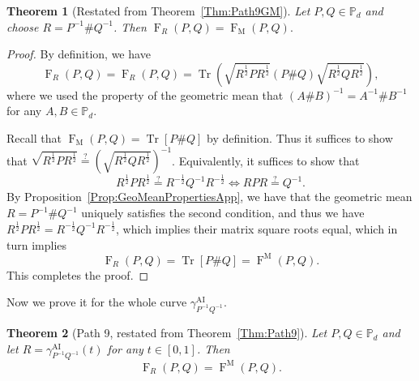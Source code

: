 \documentclass[12pt]{article}
\newtheorem{theorem}{Theorem}[section] %
\theoremstyle{definition}
\begin{document}
\begin{theorembox}
\begin{theorem} [Restated from Theorem~\ref{Thm:Path9GM}] \label{AppThm:Path9GM}
Let $P,Q \in \mathbb{P}_d$ and choose $R = P^{-1} \# Q^{-1}$. Then $\operatorname{F}_R(P,Q) = \operatorname{F}_\mathrm{M}(P,Q).$
\end{theorem}
\label{AppThm:MatsFidelityatGeoMean}
\end{theorembox}

\begin{proof}
By definition, we have
\begin{equation}
\operatorname{F}_R(P,Q) = \operatorname{F}_R(P,Q) = \operatorname{Tr}\left(\sqrt{R^{\frac 12} P R^{\frac 12}} (P \# Q) \sqrt{R^{\frac 12} Q R^{\frac 12}}\right), 
\label{Eq:58}
\end{equation}
where we used the property of the geometric mean that $(A \# B)^{-1} = A^{-1} \# B^{-1}$ for any $A,B \in \mathbb{P}_d$. 

Recall that $\operatorname{F}_\mathrm{M}(P,Q) = \operatorname{Tr}[P \# Q]$ by definition. Thus it suffices to show that $\sqrt{R^{\frac 12} P R^{\frac 12}} \stackrel{?}{=} \left(\sqrt{R^{\frac 12} Q R^{\frac 12}}\right)^{-1}$. Equivalently, it suffices to show that
\begin{equation}
R^{\frac 12} P R^{\frac 12} \stackrel{?}{=} R^{-\frac 12} Q^{-1} R^{-\frac 12} \Longleftrightarrow R P R \stackrel{?}{=} Q^{-1}.
\end{equation} 
By Proposition~\ref{Prop:GeoMeanPropertiesApp}, we have that the geometric mean $R = P^{-1} \# Q^{-1}$ uniquely satisfies the second condition, and thus we have $R^{\frac 12} P R^{\frac 12} = R^{-\frac 12} Q^{-1} R^{-\frac 12}$, which implies their matrix square roots equal, which in turn implies  
\begin{equation}
\operatorname{F}_R(P,Q) = \operatorname{Tr}[P \# Q] = \operatorname{F}^\mathrm{M}(P,Q).
\end{equation} 
This completes the proof.
\end{proof}




Now we prove it for the whole curve $\gamma_{P ^{-1} Q ^{-1} }^{\mathrm{AI}} $.                                                 

\begin{theorembox}
    \begin{theorem}[Path 9, restated from Theorem~\ref{Thm:Path9}]\label{AppThm:Path9}
        Let $P, Q \in \mathbb P_d$ and let $R = \gamma_{P ^{-1} Q ^{-1} }^\mathrm{AI}(t)$ for any $t \in [0,1]$. Then 
        \begin{equation}
             \operatorname{F}_R(P,Q) = \operatorname{F}^\mathrm M(P,Q).
        \end{equation}
    \end{theorem}
\end{theorembox}
\end{document}
